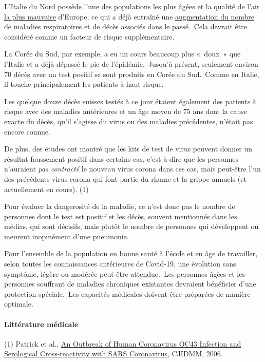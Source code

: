 L'Italie du Nord possède l'une des populations les plus âgées et la
qualité de l'air
\href{https://twitter.com/esa/status/1238480433047916545}{la plus
mauvaise} d'Europe, ce qui a déjà entraîné une
\href{https://www.thelocal.it/20170131/our-lungs-are-breaking-smog-levels-way-above-safe-limits-in-northern-italy}{augmentation
du nombre} de maladies respiratoires et de décès associés dans le
passé.~Cela devrait être considéré comme un facteur de risque
supplémentaire.

La Corée du Sud, par exemple, a eu un cours beaucoup plus «~doux~» que
l'Italie et a déjà dépassé le pic de l'épidémie.~Jusqu'à présent,
seulement environ 70 décès avec un test positif se sont produits en
Corée du Sud.~Comme en Italie, il touche principalement les patients à
haut risque.

Les quelque douze décès suisses testés à ce jour étaient également des
patients à risque avec des maladies antérieures et un âge moyen de 75
ans dont la cause exacte du décès, qu'il s'agisse du virus ou des
maladies précédentes, n'était pas encore connue.

De plus, des études ont montré que les kits de test de virus peuvent
donner un résultat faussement positif dans certains cas, c'est-à-dire
que les personnes n'auraient \emph{pas contracté} le nouveau virus
corona dans ces cas, mais peut-être l'un des précédents virus corona qui
font partie du rhume et la grippe annuels (et actuellement en cours).
(1)

Pour évaluer la dangerosité de la maladie, ce n'est donc pas le nombre
de personnes dont le test est positif et les décès, souvent mentionnés
dans les médias, qui sont décisifs, mais plutôt le nombre de personnes
qui développent ou meurent inopinément d'une pneumonie.

Pour l'ensemble de la population en bonne santé à l'école et en âge de
travailler, selon toutes les connaissances antérieures de Covid-19, une
évolution sans symptôme, légère ou modérée peut être attendue.~Les
personnes âgées et les personnes souffrant de maladies chroniques
existantes devraient bénéficier d'une protection spéciale.~Les capacités
médicales doivent être préparées de manière optimale.

\hypertarget{littuxe9rature-muxe9dicale}{%
\paragraph{Littérature médicale}\label{littuxe9rature-muxe9dicale}}

(1) Patrick et al.,
\href{https://www.ncbi.nlm.nih.gov/pmc/articles/PMC2095096/}{An Outbreak
of Human Coronavirus OC43 Infection and Serological Cross-reactivity
with SARS Coronavirus}, CJIDMM, 2006.


